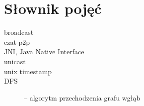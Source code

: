 \documentclass[11pt,leqno]{article}
\begin{document}

\section{Słownik pojęć} \label{sec:dictionary}

\begin{description}
	\item[broadcast]
	\item[czat p2p]
	\item[JNI, Java Native Interface]
	\item[unicast]
	\item[unix timestamp]
	\item[DFS] -- algorytm przechodzenia grafu wgłąb
\end{description}
\end{document}
